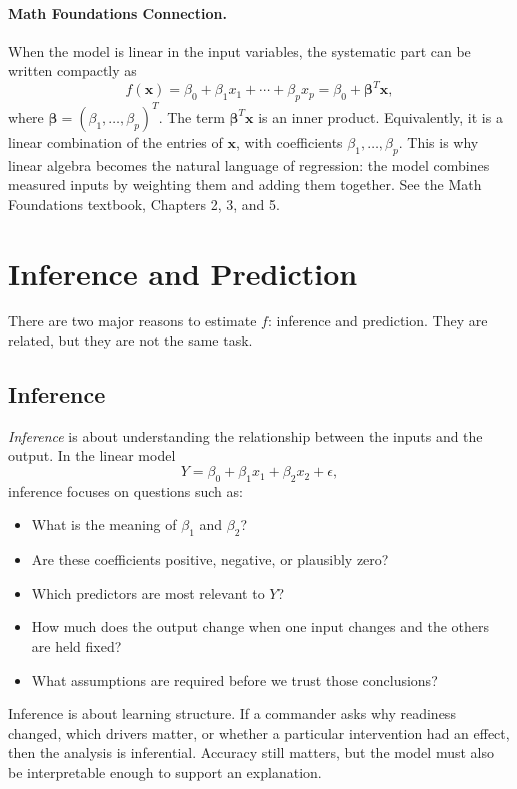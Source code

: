 \paragraph{Math Foundations Connection.}
When the model is linear in the input variables, the systematic part can be written compactly as
\[
  f(\mathbf{x}) = \beta_0 + \beta_1 x_1 + \cdots + \beta_p x_p
  = \beta_0 + \boldsymbol{\beta}^T \mathbf{x},
\]
where $\boldsymbol{\beta} = (\beta_1,\ldots,\beta_p)^T$.  The term $\boldsymbol{\beta}^T\mathbf{x}$ is an inner product.  Equivalently, it is a linear combination of the entries of $\mathbf{x}$, with coefficients $\beta_1,\ldots,\beta_p$.  This is why linear algebra becomes the natural language of regression: the model combines measured inputs by weighting them and adding them together.  See the Math Foundations textbook, Chapters 2, 3, and 5.

\section{Inference and Prediction}

There are two major reasons to estimate $f$: inference and prediction.  They are related, but they are not the same task.

\subsection{Inference}

\emph{Inference} is about understanding the relationship between the inputs and the output.  In the linear model
\[
  Y = \beta_0 + \beta_1 x_1 + \beta_2 x_2 + \epsilon,
\]
inference focuses on questions such as:
\begin{itemize}
  \item What is the meaning of $\beta_1$ and $\beta_2$?
  \item Are these coefficients positive, negative, or plausibly zero?
  \item Which predictors are most relevant to $Y$?
  \item How much does the output change when one input changes and the others are held fixed?
  \item What assumptions are required before we trust those conclusions?
\end{itemize}

Inference is about learning structure.  If a commander asks why readiness changed, which drivers matter, or whether a particular intervention had an effect, then the analysis is inferential.  Accuracy still matters, but the model must also be interpretable enough to support an explanation.

